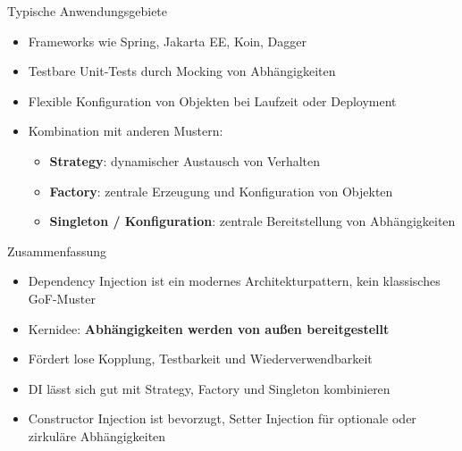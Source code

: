 \begin{frame}{Typische Anwendungsgebiete}
\begin{itemize}
    \item Frameworks wie Spring, Jakarta EE, Koin, Dagger
    \item Testbare Unit-Tests durch Mocking von Abhängigkeiten
    \item Flexible Konfiguration von Objekten bei Laufzeit oder Deployment
    \item Kombination mit anderen Mustern:
    \begin{itemize}
        \item \textbf{Strategy}: dynamischer Austausch von Verhalten
        \item \textbf{Factory}: zentrale Erzeugung und Konfiguration von Objekten
        \item \textbf{Singleton / Konfiguration}: zentrale Bereitstellung von Abhängigkeiten
    \end{itemize}
\end{itemize}
\end{frame}

\begin{frame}{Zusammenfassung}
	\begin{itemize}
	    \item Dependency Injection ist ein modernes Architekturpattern, kein klassisches GoF-Muster
	    \item Kernidee: \textbf{Abhängigkeiten werden von außen bereitgestellt}
	    \item Fördert lose Kopplung, Testbarkeit und Wiederverwendbarkeit
	    \item DI lässt sich gut mit Strategy, Factory und Singleton kombinieren
	    \item Constructor Injection ist bevorzugt, Setter Injection für optionale oder zirkuläre Abhängigkeiten
	\end{itemize}
\end{frame}
